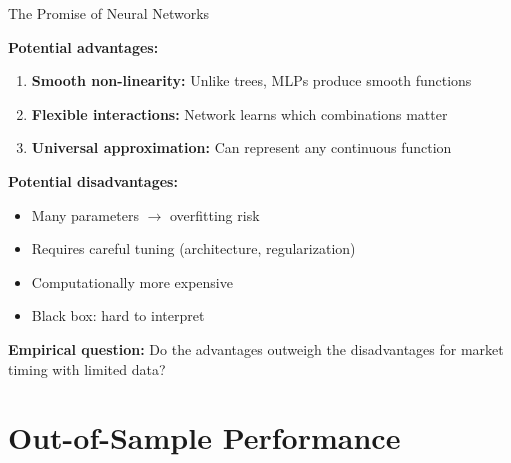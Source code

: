 \documentclass[10pt]{beamer}
\newcommand{\highlight}[1]{\textcolor{AccentOrange}{\textbf{#1}}}
\begin{document}
\begin{frame}{The Promise of Neural Networks}

  \textbf{Potential advantages:}
  \begin{enumerate}
    \item \highlight{Smooth non-linearity:} Unlike trees, MLPs produce smooth functions
    \item \highlight{Flexible interactions:} Network learns which combinations matter
    \item \highlight{Universal approximation:} Can represent any continuous function
  \end{enumerate}

  \vspace{1em}
  \textbf{Potential disadvantages:}
  \begin{itemize}
    \item Many parameters $\rightarrow$ overfitting risk
    \item Requires careful tuning (architecture, regularization)
    \item Computationally more expensive
    \item Black box: hard to interpret
  \end{itemize}

  \vspace{0.5em}
  \textbf{Empirical question:} Do the advantages outweigh the disadvantages for market timing with limited data?
\end{frame}

\section{Out-of-Sample Performance}
\end{document}
